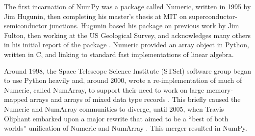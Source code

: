 

The first incarnation of NumPy was a package called Numeric, written in 1995
by Jim Hugunin, then completing his master's thesis at MIT on
superconductor-semiconductor junctions.  Hugunin based his package on previous
work by Jim Fulton, then working at the US Geological Survey, and acknowledges
many others in his initial report of the package \cite{Hugunin-whitepaper}.
Numeric provided an array object in Python, written in C, and linking to
standard fast implementations of linear algebra.




Around 1998, the Space Telescope Science Institute (STScI) software group began
to use Python heavily and, around 2000, wrote a re-implementation of much of
Numeric, called NumArray, to support their need to work on large memory-mapped
arrays and arrays of mixed data type records \cite{STScI-slither}.  This
briefly caused the Numeric and NumArray communities to diverge, until 2005,
when Travis Oliphant embarked upon a major rewrite that aimed to be a ``best of
both worlds'' unification of Numeric and NumArray \cite{oliphant2006guide}.
This merger resulted in NumPy.

